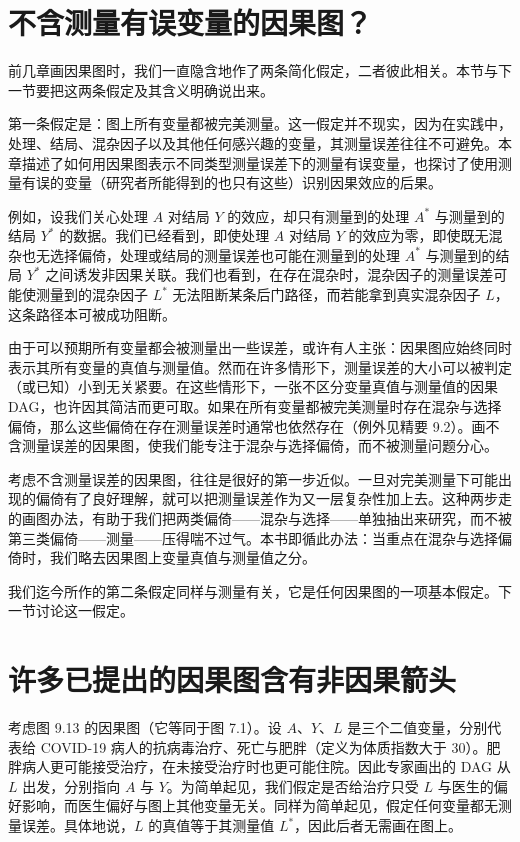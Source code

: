 \section{不含测量有误变量的因果图？}

前几章画因果图时，我们一直隐含地作了两条简化假定，二者彼此相关。本节与下一节要把这两条假定及其含义明确说出来。

第一条假定是：图上所有变量都被完美测量。这一假定并不现实，因为在实践中，处理、结局、混杂因子以及其他任何感兴趣的变量，其测量误差往往不可避免。本章描述了如何用因果图表示不同类型测量误差下的测量有误变量，也探讨了使用测量有误的变量（研究者所能得到的也只有这些）识别因果效应的后果。

例如，设我们关心处理 $A$ 对结局 $Y$ 的效应，却只有测量到的处理 $A^{*}$ 与测量到的结局 $Y^{*}$ 的数据。我们已经看到，即使处理 $A$ 对结局 $Y$ 的效应为零，即使既无混杂也无选择偏倚，处理或结局的测量误差也可能在测量到的处理 $A^{*}$ 与测量到的结局 $Y^{*}$ 之间诱发非因果关联。我们也看到，在存在混杂时，混杂因子的测量误差可能使测量到的混杂因子 $L^{*}$ 无法阻断某条后门路径，而若能拿到真实混杂因子 $L$，这条路径本可被成功阻断。

由于可以预期所有变量都会被测量出一些误差，或许有人主张：因果图应始终同时表示其所有变量的真值与测量值。然而在许多情形下，测量误差的大小可以被判定（或已知）小到无关紧要。在这些情形下，一张不区分变量真值与测量值的因果 DAG，也许因其简洁而更可取。如果在所有变量都被完美测量时存在混杂与选择偏倚，那么这些偏倚在存在测量误差时通常也依然存在（例外见精要 9.2）。画不含测量误差的因果图，使我们能专注于混杂与选择偏倚，而不被测量问题分心。

考虑不含测量误差的因果图，往往是很好的第一步近似。一旦对完美测量下可能出现的偏倚有了良好理解，就可以把测量误差作为又一层复杂性加上去。这种两步走的画图办法，有助于我们把两类偏倚——混杂与选择——单独抽出来研究，而不被第三类偏倚——测量——压得喘不过气。本书即循此办法：当重点在混杂与选择偏倚时，我们略去因果图上变量真值与测量值之分。

我们迄今所作的第二条假定同样与测量有关，它是任何因果图的一项基本假定。下一节讨论这一假定。

\section{许多已提出的因果图含有非因果箭头}

考虑图 9.13 的因果图（它等同于图 7.1）。设 $A$、$Y$、$L$ 是三个二值变量，分别代表给 COVID-19 病人的抗病毒治疗、死亡与肥胖（定义为体质指数大于 30）。肥胖病人更可能接受治疗，在未接受治疗时也更可能住院。因此专家画出的 DAG 从 $L$ 出发，分别指向 $A$ 与 $Y$。为简单起见，我们假定是否给治疗只受 $L$ 与医生的偏好影响，而医生偏好与图上其他变量无关。同样为简单起见，假定任何变量都无测量误差。具体地说，$L$ 的真值等于其测量值 $L^{*}$，因此后者无需画在图上。

